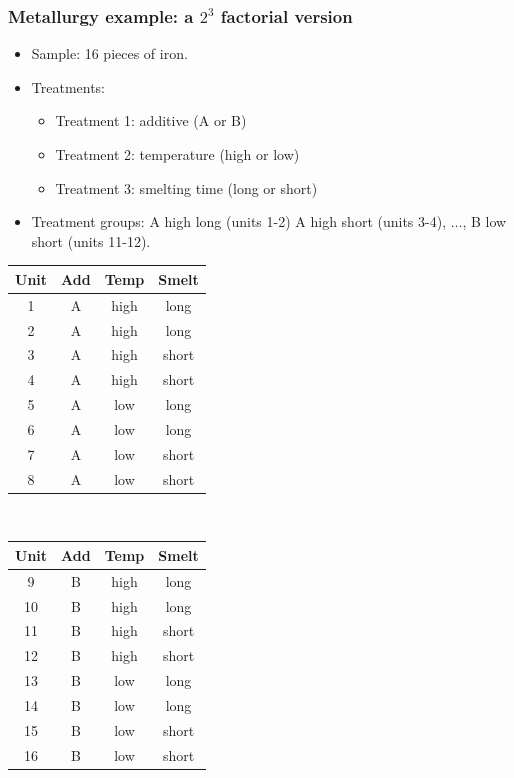\documentclass[handout]{beamer}
\numberwithin{equation}{section}
\begin{document}
\begin{frame}
\frametitle{Metallurgy example: a $2^3$ factorial version} \scriptsize

\begin{itemize}
 \item Sample: 16 pieces of iron.
\pause \item Treatments:
\begin{itemize}
 \item Treatment 1: additive (A or B)
\pause \item Treatment 2: temperature (high or low)
\pause \item Treatment 3: smelting time (long or short)
\end{itemize}
\pause \item Treatment groups: A high long (units 1-2) A high short (units 3-4), $\ldots$, B low short (units 11-12).
\end{itemize}

\begin{center}
\begin{tabular}{c|c|c|c}
Unit & Add & Temp & Smelt \\ \hline
1 & A & high & long \\ 
2 & A & high & long \\ 
3 & A & high & short \\ 
4 & A & high & short \\ 
5 & A & low & long \\ 
6 & A & low & long\\ 
7 & A & low & short \\ 
8 & A & low & short \\ 
\end{tabular}$\quad$ \begin{tabular}{c|c|c|c}
Unit & Add & Temp & Smelt \\ \hline
9 & B & high & long \\ 
10 & B & high & long \\ 
11 & B & high & short \\ 
12 & B & high & short \\ 
13 & B & low & long \\ 
14 & B & low & long \\ 
15 & B & low & short \\ 
16 & B & low & short \\ 
\end{tabular}
\end{center}
\end{frame}
\end{document}
